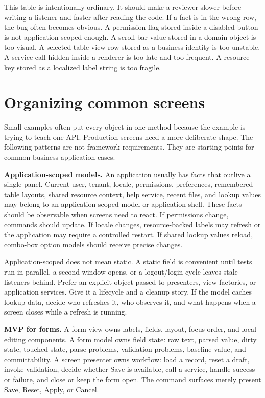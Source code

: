 This table is intentionally ordinary. It should make a reviewer slower before writing a listener and faster after reading the code. If a fact is in the wrong row, the bug often becomes obvious. A permission flag stored inside a disabled button is not application-scoped enough. A scroll bar value stored in a domain object is too visual. A selected table view row stored as a business identity is too unstable. A service call hidden inside a renderer is too late and too frequent. A resource key stored as a localized label string is too fragile.

\section{Organizing common screens}

Small examples often put every object in one method because the example is trying to teach one API. Production screens need a more deliberate shape. The following patterns are not framework requirements. They are starting points for common business-application cases.

\textbf{Application-scoped models.} An application usually has facts that outlive a single panel. Current user, tenant, locale, permissions, preferences, remembered table layouts, shared resource context, help service, recent files, and lookup values may belong to an application-scoped model or application shell. These facts should be observable when screens need to react. If permissions change, commands should update. If locale changes, resource-backed labels may refresh or the application may require a controlled restart. If shared lookup values reload, combo-box option models should receive precise changes.

Application-scoped does not mean static. A static  field is convenient until tests run in parallel, a second window opens, or a logout/login cycle leaves stale listeners behind. Prefer an explicit object passed to presenters, view factories, or application services. Give it a lifecycle and a cleanup story. If the model caches lookup data, decide who refreshes it, who observes it, and what happens when a screen closes while a refresh is running.

\textbf{MVP for forms.} A form view owns labels, fields, layout, focus order, and local editing components. A form model owns field state: raw text, parsed value, dirty state, touched state, parse problems, validation problems, baseline value, and committability. A screen presenter owns workflow: load a record, reset a draft, invoke validation, decide whether Save is available, call a service, handle success or failure, and close or keep the form open. The command surfaces merely present Save, Reset, Apply, or Cancel.

